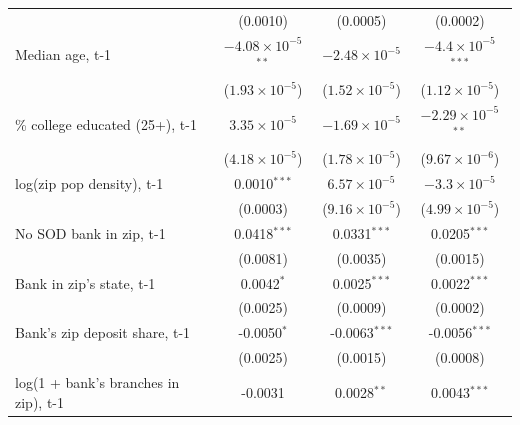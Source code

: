 \begin{tabular}{lS[table-format=-1.4]S[table-format=-1.4]S[table-format=-1.4]}
                                           & (0.0010)                      & (0.0005)                & (0.0002)\\   
      Median age, t-1                      &  &  &  \\    
                                           &  &  &  \\    
      \% college educated (25+), t-1       &  &  &  \\    
                                           &  &  &  \\    
      log(zip pop density), t-1            & 0.0010{$^{***}$}                &  &  \\    
                                           & (0.0003)                      &  &  \\    
      No SOD bank in zip, t-1              & 0.0418{$^{***}$}                & 0.0331{$^{***}$}          & 0.0205{$^{***}$}\\   
                                           & (0.0081)                      & (0.0035)                & (0.0015)\\   
      Bank in zip's state, t-1             & 0.0042{$^{*}$}                  & 0.0025{$^{***}$}          & 0.0022{$^{***}$}\\   
                                           & (0.0025)                      & (0.0009)                & (0.0002)\\   
      Bank's zip deposit share, t-1        & -0.0050{$^{*}$}                 & -0.0063{$^{***}$}         & -0.0056{$^{***}$}\\   
                                           & (0.0025)                      & (0.0015)                & (0.0008)\\   
      log(1 + bank's branches in zip), t-1 & -0.0031                       & 0.0028{$^{**}$}           & 0.0043{$^{***}$}\\   

\end{tabular}
